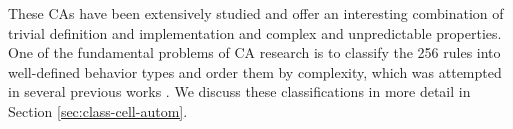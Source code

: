 These \acp{CA} have been extensively studied and offer an interesting combination of
trivial definition and implementation and complex and unpredictable properties.
One of the fundamental problems of \ac{CA} research is to classify the 256 rules
into well-defined behavior types and order them by complexity, which was
attempted in several previous works
\parencite{wuenscheGlobalDynamicsCellular1992,
  gutowitzTransientsCyclesComplexity1991,
  wuenscheClassifyingCellularAutomata1999, wolframNewKindScience2002,
  zenilCompressionBasedInvestigationDynamical2010,
  hudcovaClassificationComplexSystems2020,
  hudcovaComputationalHierarchyElementary2021}. We discuss these classifications
in more detail in Section \ref{sec:class-cell-autom}.

\begin{figure}[htbp]
  \centering
  \begin{subfigure}[t]{.04\linewidth}
  \centering

\end{subfigure}
\end{figure}
